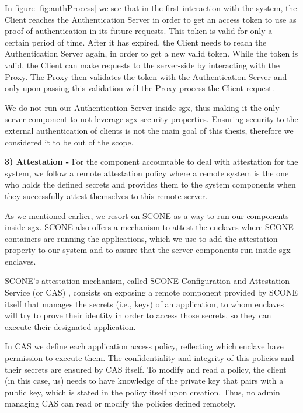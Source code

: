 In figure \ref{fig:authProcess} we see that in the first interaction with the system, the Client reaches the Authentication Server in order to get an access token to use as proof of authentication in its future requests. This token is valid for only a certain period of time. After it has expired, the Client needs to reach the Authentication Server again, in order to get a new valid token. While the token is valid, the Client can make requests to the server-side by interacting with the Proxy. The Proxy then validates the token with the Authentication Server and only upon passing this validation will the Proxy process the Client request.

We do not run our Authentication Server inside \gls{sgx}, thus making it the only server component to not leverage \gls{sgx} security properties. Ensuring security to the external authentication of clients is not the main goal of this thesis, therefore we considered it to be out of the scope.

\vspace{5mm} 

\textbf{3) Attestation -}
For the component accountable to deal with attestation for the system, we follow a remote attestation policy where a remote system is the one who holds the defined secrets and provides them to the system components when they successfully attest themselves to this remote server.

As we mentioned earlier, we resort on SCONE as a way to run our components inside \gls{sgx}. SCONE also offers a mechanism to attest the enclaves where SCONE containers are running the applications, which we use to add the attestation property to our system and to assure that the server components run inside \gls{sgx} enclaves. 

SCONE's attestation mechanism, called SCONE Configuration and Attestation Service (or CAS) \cite{sconeCAS}, consists on exposing a remote component provided by SCONE itself that manages the secrets (i.e., keys) of an application, to whom enclaves will try to prove their identity in order to access those secrets, so they can execute their designated application. 

In CAS we define each application access policy, reflecting which enclave have permission to execute them. The confidentiality and integrity of this policies and their secrets are ensured by CAS itself. To modify and read a policy, the client (in this case, us) needs to have knowledge of the private key that pairs with a public key, which is stated in the policy itself upon creation. Thus, no admin managing CAS can read or modify the policies defined remotely.




